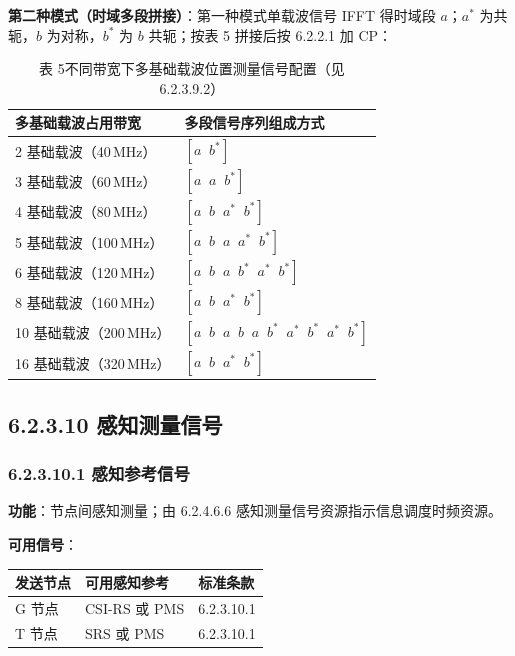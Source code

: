 \documentclass[11pt,a4paper]{ctexart}
\begin{document}
\textbf{第二种模式（时域多段拼接）}：第一种模式单载波信号 IFFT 得时域段 $a$；$a^*$ 为共轭，$b$ 为对称，$b^*$ 为 $b$ 共轭；按表 5 拼接后按 6.2.2.1 加 CP：

\begin{table}[h]
\centering
\small
\caption{表 5\quad 不同带宽下多基础载波位置测量信号配置（见 6.2.3.9.2）}
\begin{tabular}{ll}
\toprule
\textbf{多基础载波占用带宽} & \textbf{多段信号序列组成方式} \\
\midrule
2 基础载波（40\,MHz） & $[a\;\; b^*]$ \\
3 基础载波（60\,MHz） & $[a\;\; a\;\; b^*]$ \\
4 基础载波（80\,MHz） & $[a\;\; b\;\; a^*\;\; b^*]$ \\
5 基础载波（100\,MHz） & $[a\;\; b\;\; a\;\; a^*\;\; b^*]$ \\
6 基础载波（120\,MHz） & $[a\;\; b\;\; a\;\; b^*\;\; a^*\;\; b^*]$ \\
8 基础载波（160\,MHz） & $[a\;\; b\;\; a^*\;\; b^*]$ \\
10 基础载波（200\,MHz） & $[a\;\; b\;\; a\;\; b\;\; a\;\; b^*\;\; a^*\;\; b^*\;\; a^*\;\; b^*]$ \\
16 基础载波（320\,MHz） & $[a\;\; b\;\; a^*\;\; b^*]$ \\
\bottomrule
\end{tabular}
\end{table}

\subsection{6.2.3.10 感知测量信号}

\subsubsection{6.2.3.10.1 感知参考信号}

\textbf{功能}：节点间感知测量；由 6.2.4.6.6 感知测量信号资源指示信息调度时频资源。

\textbf{可用信号}：
\begin{table}[h]
\centering
\small
\begin{tabular}{lll}
\toprule
\textbf{发送节点} & \textbf{可用感知参考} & \textbf{标准条款} \\
\midrule
G 节点 & CSI-RS 或 PMS & 6.2.3.10.1 \\
T 节点 & SRS 或 PMS & 6.2.3.10.1 \\
\bottomrule
\end{tabular}
\end{table}
\end{document}
